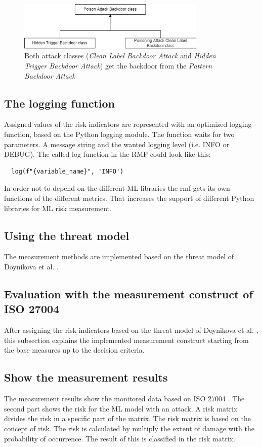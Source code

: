 \begin{figure}[ht!]
  \centering
  \includegraphics[width=9cm]{pictures/attack_relationship.png}
  \caption{Both attack classes (\textit{Clean Label Backdoor Attack} and \textit{Hidden Trigger Backdoor Attack}) get the backdoor from the \textit{Pattern Backdoor Attack}}
  \label{fig:relation_risk_ind}
\end{figure}

\subsection{The logging function}

Assigned values of the risk indicators are represented with an optimized logging function, based on the Python logging module. The function waits for two parameters. A message string and the wanted logging level (i.e. INFO or DEBUG). The called log function in the RMF could look like this:
\begin{lstlisting}
  log(f"{variable_name}", 'INFO')
\end{lstlisting}

In order not to depend on the different ML libraries the rmf gets its own functions of the different metrics. That increases the support of different Python libraries for ML risk
measurement.

\subsection{Using the threat model}
The measurement methods are implemented based on the threat model of Doynikova et al. \cite{DBLP:conf/crisis/DoynikovaNGK20}.
\subsection{Evaluation with the measurement construct of ISO 27004}

After assigning the risk indicators based on the threat model of Doynikova et al. \cite{DBLP:conf/crisis/DoynikovaNGK20}, this subsection explains the implemented measurement construct starting from the base measures up to the decision criteria. \\

\subsection{Show the measurement results}

The measurement results show the monitored data based on ISO 27004 \cite{ISO_27004_2009}. The second part shows the risk for the ML model with an attack. A risk matrix divides the risk in a specific part of the matrix. The risk matrix is based on the concept of risk. The risk is calculated by multiply the extent of damage with the probability of occurrence. The result of this is classified in the risk matrix.
